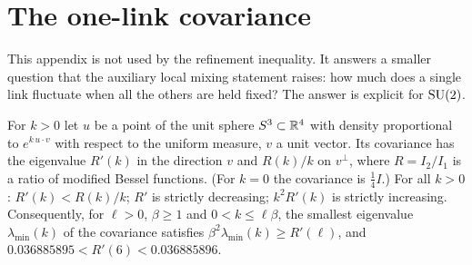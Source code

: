 \section{The one-link covariance}\label{s:haar}
This appendix is not used by the refinement inequality. It answers a smaller question that the auxiliary
local mixing statement raises: how much does a single link fluctuate when all the others are held fixed? The
answer is explicit for $\mathrm{SU}(2)$.

\begin{proposition}\label{p:haar}
For $k>0$ let $u$ be a point of the unit sphere $S^3\subset\mathbb{R}^4$ with density proportional to
$e^{k\,u\cdot v}$ with respect to the uniform measure, $v$ a unit vector. Its covariance has the eigenvalue
$R'(k)$ in the direction $v$ and $R(k)/k$ on $v^\perp$, where $R=I_2/I_1$ is a ratio of modified Bessel
functions. (For $k=0$ the covariance is $\tfrac14I$.) For all $k>0$: $R'(k)<R(k)/k$; $R'$ is strictly decreasing;
$k^2R'(k)$ is strictly increasing.
Consequently, for $\ell>0$, $\beta\ge1$ and $0<k\le\ell\beta$, the smallest eigenvalue $\lambda_{\min}(k)$ of the
covariance satisfies $\beta^2\lambda_{\min}(k)\ge R'(\ell)$, and $0.036885895<R'(6)<0.036885896$.
\end{proposition}

